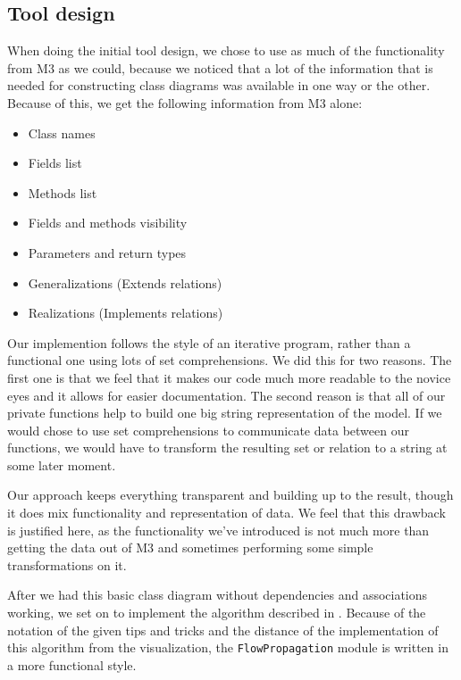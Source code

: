 \subsection{Tool design}
	When doing the initial tool design, we chose to use as much of the functionality from M3 as we could, because we noticed that a lot of the information that is needed for constructing class diagrams was available in one way or the other.
	Because of this, we get the following information from M3 alone:

	\begin{itemize}
		\item Class names
		\item Fields list
		\item Methods list
		\item Fields and methods visibility
		\item Parameters and return types
		\item Generalizations (Extends relations)
		\item Realizations (Implements relations)
	\end{itemize}

	Our implemention follows the style of an iterative program, rather than a functional one using lots of set comprehensions.
	We did this for two reasons.
	The first one is that we feel that it makes our code much more readable to the novice eyes and it allows for easier documentation.
	The second reason is that all of our private functions help to build one big string representation of the model.
	If we would chose to use set comprehensions to communicate data between our functions, we would have to transform the resulting set or relation to a string at some later moment.

	Our approach keeps everything transparent and building up to the result, though it does mix functionality and representation of data.
	We feel that this drawback is justified here, as the functionality we've introduced is not much more than getting the data out of M3 and sometimes performing some simple transformations on it.
	
	After we had this basic class diagram without dependencies and associations working, we set on to implement the algorithm described in \cite{rev-eng}.
	Because of the notation of the given tips and tricks and the distance of the implementation of this algorithm from the visualization, the \texttt{FlowPropagation} module is written in a more functional style.\\

